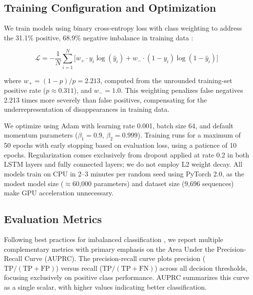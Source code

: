 \documentclass[pdflatex,sn-mathphys-num]{sn-jnl}%
\theoremstyle{thmstyleone}%
\theoremstyle{thmstyletwo}%
\theoremstyle{thmstylethree}%
\begin{document}
\subsection{Training Configuration and Optimization}

We train models using binary cross-entropy loss with class weighting to address the 31.1\% positive, 68.9\% negative imbalance in training data \cite{he2009learning}:

\begin{equation}
\mathcal{L} = -\frac{1}{N} \sum_{i=1}^N \bigl[w_+ \cdot y_i \log(\hat{y}_i) + w_- \cdot (1-y_i) \log(1-\hat{y}_i)\bigr]
\end{equation}

\noindent where $w_+ = (1-p)/p = 2.213$, computed from the unrounded training-set positive rate ($p \approx 0.311$), and $w_- = 1.0$. This weighting penalizes false negatives 2.213 times more severely than false positives, compensating for the underrepresentation of disappearances in training data.

We optimize using Adam \cite{kingma2015adam} with learning rate 0.001, batch size 64, and default momentum parameters ($\beta_1{=}0.9$, $\beta_2{=}0.999$). Training runs for a maximum of 50 epochs with early stopping based on evaluation loss, using a patience of 10 epochs. Regularization comes exclusively from dropout \cite{srivastava2014dropout} applied at rate 0.2 in both LSTM layers and fully connected layers; we do not employ L2 weight decay. All models train on CPU in 2--3 minutes per random seed using PyTorch 2.0, as the modest model size (${\approx}$60,000 parameters) and dataset size (9,696 sequences) make GPU acceleration unnecessary.

\subsection{Evaluation Metrics}

Following best practices for imbalanced classification \cite{saito2015precision}, we report multiple complementary metrics with primary emphasis on the Area Under the Precision-Recall Curve (AUPRC). The precision-recall curve plots precision ($\text{TP}/(\text{TP}+\text{FP})$) versus recall ($\text{TP}/(\text{TP}+\text{FN})$) across all decision thresholds, focusing exclusively on positive class performance. AUPRC summarizes this curve as a single scalar, with higher values indicating better classification.
\end{document}
